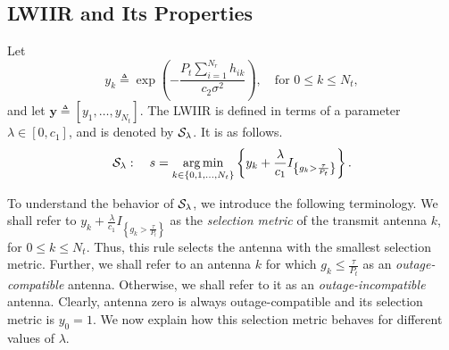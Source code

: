 \documentclass[12pt,draftcls,peerreview,onecolumn]{IEEEtran}
\newcommand{\cbrac}[1]{\left\{{#1}\right\}}
\newcommand{\indic}[1]{I_{\cbrac{#1}}}
\newcommand{\define}{\triangleq}
\DeclareMathOperator*{\argmin}{arg\,min}
\newcommand{\y}{\mathbf{y}}
\newcommand{\nx}{{0}}
\newcommand{\lam}{\lambda}
\newcommand{\Nt}{{N_t}}
\newcommand{\Nr}{{N_r}}
\newcommand{\Pt}{{P_t}}
\newcommand{\such}{h}
\newcommand{\puch}{g}
\newcommand{\hk}[1]{{\such_{#1}}}
\newcommand{\gk}[1]{{\puch_{#1}}}
\newcommand{\noisevar}{\sigma^2}
\newcommand{\itau}{\tau}
\newcommand{\cone}{c_{1}}
\newcommand{\ctwo}{c_{2}}
\newcommand{\m}{\cone}
\newcommand{\taubypt}{\frac{\itau}{\Pt}}
\newcommand{\gkgrtaubypt}[1]{{\gk{#1}}>\taubypt}
\newcommand{\gklttaubypt}[1]{{\gk{#1}}\leq\taubypt}
\newcommand{\gindic}[1]{\indic{\gkgrtaubypt{#1}}}
\newcommand{\lambym}{\frac{\lam}{\m}}
\newcommand{\yk}[1]{y_{#1}}
\newcommand{\ykplusgk}[1]{ \yk{#1} + \lambym\gindic{#1}}
\newcommand{\allopts}{\left\{\nx,1,\ldots,\Nt\right\}}
\newcommand{\callamrule}{{\cal S_{{\lam}}}}
\begin{document}
\subsection{LWIIR and Its Properties}
\label{sec:lambda_rule}
Let 
\begin{equation}
\yk{k} \define  \exp\left({- \frac{\Pt\sum_{i=1}^{\Nr}\hk{ik}}{\ctwo\noisevar} }\right), \quad \text{for}\,\,  0\leq k \leq\Nt,
\label{eq:yi_def}
\end{equation}
and let $\y \define [\yk{1},\ldots,\yk{\Nt}]$. The LWIIR is defined in terms of a parameter $\lam \in \left[0, \cone\right]$, and is denoted by $\callamrule$. It is as follows.
\begin{equation}
\callamrule: \quad s=\argmin\limits_{k\in\allopts} \left\{ \ykplusgk{k} \right\}.
\label{eq:lam_weight_rule}
\end{equation}

To understand the behavior of $\callamrule$, we introduce the following terminology. We shall refer to 
$\ykplusgk{k}$
as the {\em selection metric} of the transmit antenna $k$, for $0\leq k \leq\Nt$. Thus, this rule selects the antenna with the smallest selection metric. Further, we shall refer to an antenna $k$ for which $\gklttaubypt{k}$ as an {\em outage-compatible} antenna. Otherwise, we shall refer to it as an {\em outage-incompatible} antenna.  Clearly, antenna zero is always outage-compatible and its selection metric is $\yk{0}=1$. We now explain how this selection metric behaves for different values of $\lam$.
\end{document}
